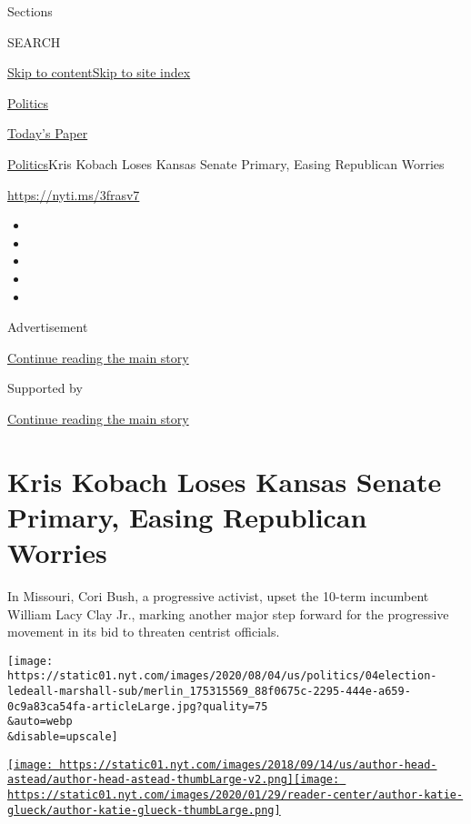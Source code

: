 Sections

SEARCH

\protect\hyperlink{site-content}{Skip to
content}\protect\hyperlink{site-index}{Skip to site index}

\href{https://www.nytimes.com/section/politics}{Politics}

\href{https://myaccount.nytimes.com/auth/login?response_type=cookie\&client_id=vi}{}

\href{https://www.nytimes.com/section/todayspaper}{Today's Paper}

\href{/section/politics}{Politics}\textbar{}Kris Kobach Loses Kansas
Senate Primary, Easing Republican Worries

\url{https://nyti.ms/3frasv7}

\begin{itemize}
\item
\item
\item
\item
\item
\end{itemize}

Advertisement

\protect\hyperlink{after-top}{Continue reading the main story}

Supported by

\protect\hyperlink{after-sponsor}{Continue reading the main story}

\hypertarget{kris-kobach-loses-kansas-senate-primary-easing-republican-worries}{%
\section{Kris Kobach Loses Kansas Senate Primary, Easing Republican
Worries}\label{kris-kobach-loses-kansas-senate-primary-easing-republican-worries}}

In Missouri, Cori Bush, a progressive activist, upset the 10-term
incumbent William Lacy Clay Jr., marking another major step forward for
the progressive movement in its bid to threaten centrist officials.

\texttt{[image: https://static01.nyt.com/images/2020/08/04/us/politics/04election-ledeall-marshall-sub/merlin\_175315569\_88f0675c-2295-444e-a659-0c9a83ca54fa-articleLarge.jpg?quality=75\\\&auto=webp\\\&disable=upscale]}

\href{https://www.nytimes.com/by/astead-w-herndon}{\texttt{[image: https://static01.nyt.com/images/2018/09/14/us/author-head-astead/author-head-astead-thumbLarge-v2.png]}}\href{https://www.nytimes.com/by/katie-glueck}{\texttt{[image: https://static01.nyt.com/images/2020/01/29/reader-center/author-katie-glueck/author-katie-glueck-thumbLarge.png]}}


